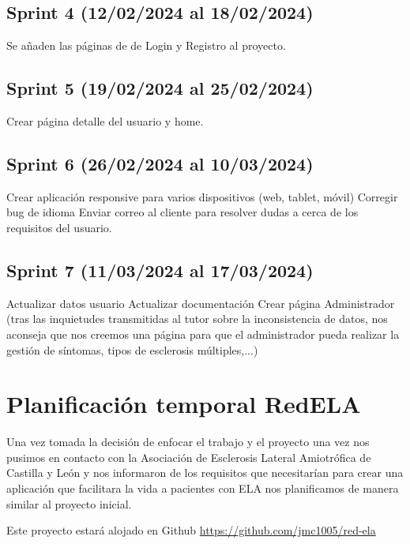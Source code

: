 \subsection{Sprint 4 (12/02/2024 al 18/02/2024)}
Se añaden las páginas de de Login y Registro al proyecto.

\subsection{Sprint 5 (19/02/2024 al 25/02/2024)}
Crear página detalle del usuario y home.

\subsection{Sprint 6 (26/02/2024 al 10/03/2024)}
Crear aplicación responsive para varios dispositivos (web, tablet, móvil)
Corregir bug de idioma
Enviar correo al cliente para resolver dudas a cerca de los requisitos del usuario.

\subsection{Sprint 7 (11/03/2024 al 17/03/2024)}
Actualizar datos usuario
Actualizar documentación
Crear página Administrador (tras las inquietudes transmitidas al tutor sobre la inconsistencia de datos, nos aconseja que nos creemos una página para que el administrador pueda realizar la gestión de síntomas, tipos de esclerosis múltiples,...)

\section{Planificación temporal RedELA}
Una vez tomada la decisión de enfocar el trabajo y el proyecto una vez nos pusimos en contacto con la Asociación de Esclerosis Lateral Amiotrófica de Castilla y León y nos informaron de los requisitos que necesitarían para crear una aplicación que facilitara la vida a pacientes con ELA nos planificamos de manera similar al proyecto inicial.

Este proyecto estará alojado en Github \url{https://github.com/jmc1005/red-ela}

